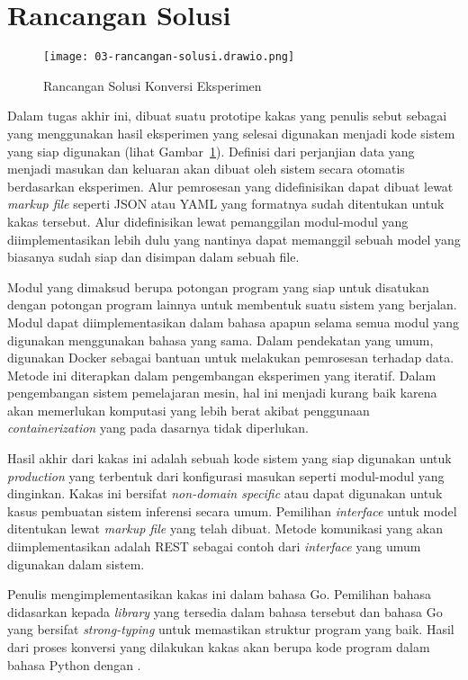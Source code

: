 \section{Rancangan Solusi}

\begin{figure}[ht]
  \centering
  \texttt{[image: 03-rancangan-solusi.drawio.png]}
  \caption{Rancangan Solusi Konversi Eksperimen}\label{fig:03-tool}
\end{figure}

Dalam tugas akhir ini, dibuat suatu prototipe kakas yang penulis sebut sebagai  yang menggunakan hasil eksperimen yang selesai digunakan menjadi kode sistem yang siap digunakan (lihat Gambar~\ref{fig:03-tool}).
Definisi dari perjanjian data yang menjadi masukan dan keluaran akan dibuat oleh sistem secara otomatis berdasarkan eksperimen.
Alur pemrosesan yang didefinisikan dapat dibuat lewat \textit{markup file} seperti JSON atau YAML yang formatnya sudah ditentukan untuk kakas tersebut.
Alur didefinisikan lewat pemanggilan modul-modul yang diimplementasikan lebih dulu yang nantinya dapat memanggil sebuah model yang biasanya sudah siap dan disimpan dalam sebuah file.

Modul yang dimaksud berupa potongan program yang siap untuk disatukan dengan potongan program lainnya untuk membentuk suatu sistem yang berjalan.
Modul dapat diimplementasikan dalam bahasa apapun selama semua modul yang digunakan menggunakan bahasa yang sama.
Dalam pendekatan yang umum, digunakan Docker sebagai bantuan untuk melakukan pemrosesan terhadap data.
Metode ini diterapkan dalam pengembangan eksperimen yang iteratif.
Dalam pengembangan sistem pemelajaran mesin, hal ini menjadi kurang baik karena akan memerlukan komputasi yang lebih berat akibat penggunaan \textit{containerization} yang pada dasarnya tidak diperlukan.

Hasil akhir dari kakas ini adalah sebuah kode sistem yang siap digunakan untuk \textit{production} yang terbentuk dari konfigurasi masukan seperti modul-modul yang dinginkan.
Kakas ini bersifat \textit{non-domain specific} atau dapat digunakan untuk kasus pembuatan sistem inferensi secara umum.
Pemilihan \textit{interface} untuk model ditentukan lewat \textit{markup file} yang telah dibuat.
Metode komunikasi yang akan diimplementasikan adalah REST sebagai contoh dari \textit{interface} yang umum digunakan dalam sistem.

Penulis mengimplementasikan kakas ini dalam bahasa Go.
Pemilihan bahasa didasarkan kepada \textit{library} yang tersedia dalam bahasa tersebut dan bahasa Go yang bersifat \textit{strong-typing} untuk memastikan struktur program yang baik.
Hasil dari proses konversi yang dilakukan kakas akan berupa kode program dalam bahasa Python dengan .

